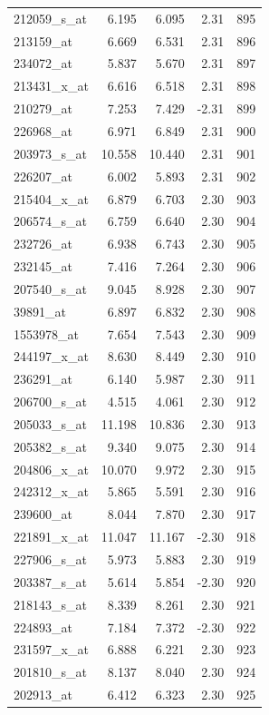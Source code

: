 \begin{footnotesize}
\begin{longtable}{lrrrr}
212059\_s\_at & 6.195 & 6.095 & 2.31 & 895 \\
213159\_at & 6.669 & 6.531 & 2.31 & 896 \\
234072\_at & 5.837 & 5.670 & 2.31 & 897 \\
213431\_x\_at & 6.616 & 6.518 & 2.31 & 898 \\
210279\_at & 7.253 & 7.429 & -2.31 & 899 \\
226968\_at & 6.971 & 6.849 & 2.31 & 900 \\
203973\_s\_at & 10.558 & 10.440 & 2.31 & 901 \\
226207\_at & 6.002 & 5.893 & 2.31 & 902 \\
215404\_x\_at & 6.879 & 6.703 & 2.30 & 903 \\
206574\_s\_at & 6.759 & 6.640 & 2.30 & 904 \\
232726\_at & 6.938 & 6.743 & 2.30 & 905 \\
232145\_at & 7.416 & 7.264 & 2.30 & 906 \\
207540\_s\_at & 9.045 & 8.928 & 2.30 & 907 \\
39891\_at & 6.897 & 6.832 & 2.30 & 908 \\
1553978\_at & 7.654 & 7.543 & 2.30 & 909 \\
244197\_x\_at & 8.630 & 8.449 & 2.30 & 910 \\
236291\_at & 6.140 & 5.987 & 2.30 & 911 \\
206700\_s\_at & 4.515 & 4.061 & 2.30 & 912 \\
205033\_s\_at & 11.198 & 10.836 & 2.30 & 913 \\
205382\_s\_at & 9.340 & 9.075 & 2.30 & 914 \\
204806\_x\_at & 10.070 & 9.972 & 2.30 & 915 \\
242312\_x\_at & 5.865 & 5.591 & 2.30 & 916 \\
239600\_at & 8.044 & 7.870 & 2.30 & 917 \\
221891\_x\_at & 11.047 & 11.167 & -2.30 & 918 \\
227906\_s\_at & 5.973 & 5.883 & 2.30 & 919 \\
203387\_s\_at & 5.614 & 5.854 & -2.30 & 920 \\
218143\_s\_at & 8.339 & 8.261 & 2.30 & 921 \\
224893\_at & 7.184 & 7.372 & -2.30 & 922 \\
231597\_x\_at & 6.888 & 6.221 & 2.30 & 923 \\
201810\_s\_at & 8.137 & 8.040 & 2.30 & 924 \\
202913\_at & 6.412 & 6.323 & 2.30 & 925 \\

\end{longtable}
\end{footnotesize}
